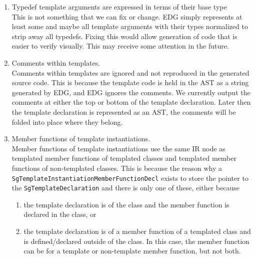 \begin{enumerate}
     \item Typedef template arguments are expressed in terms of their base type \\
     This is not something that we can fix or change. EDG simply represents 
     at least some and maybe all template arguments with their types normalized 
     to strip away all typedefs.  Fixing this would allow 
     generation of code that is easier to verify visually.  This may receive 
     some attention in the future.

     \item Comments within templates. \\
     Comments within templates are ignored and not reproduced in the generated
     source code.  This is because the template code is held in the AST as a string
     generated by EDG, and EDG ignores the comments.  We currently output the comments 
     at either the top or bottom of the template declaration.  Later then the template
     declaration is represented as an AST, the comments will be folded into place where
     they belong.

     \item Member functions of template instantiations. \\
     Member functions of template instantiations use the same IR node as 
     templated member functions of templated classes and templated member functions of
     non-templated classes.  This is because the reason why a 
     {\tt SgTemplateInstantiationMemberFunctionDecl} exists to store the pointer to the 
     {\tt SgTemplateDeclaration} and there is only one of these, either because
     \begin{enumerate}
       \item the template declaration is of the class and the member function is declared in
          the class, or
       \item the template declaration is of a member function of a templated class and is
          defined/declared outside of the class.  In this case, the member function can 
          be for a template or non-template member function, but not both.
     \end{enumerate}



\end{enumerate}
